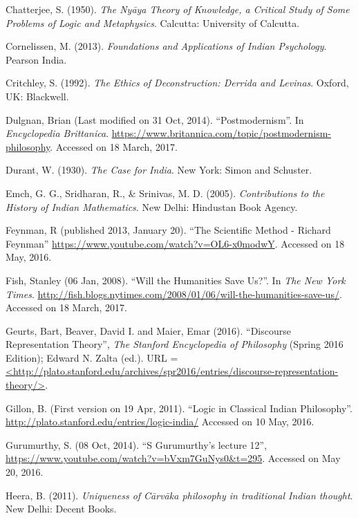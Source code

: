 \begin{thebibliography}{99}
Chatterjee, S. (1950). {\sl The Nyāya Theory of Knowledge, a Critical Study of Some Problems of Logic and Metaphysics}. Calcutta: University of Calcutta.

Cornelissen, M. (2013). {\sl Foundations and Applications of Indian Psychology}. Pearson India.

Critchley, S. (1992). {\sl The Ethics of Deconstruction: Derrida and Levinas}. Oxford, UK: Blackwell.

Dulgnan, Brian (Last modified on 31 Oct, 2014). ``Postmodernism''. In {\sl Encyclopedia Brittanica}. \url{https://www.britannica.com/topic/postmodernism-philosophy}.  Accessed on 18 March, 2017.

Durant, W. (1930). {\sl The Case for India}. New York: Simon and Schuster.

Emch, G. G., Sridharan, R., \& Srinivas, M. D. (2005). {\sl Contributions to the History of Indian Mathematics}. New Delhi: Hindustan Book Agency.

Feynman, R (published 2013, January 20). ``The Scientific Method - Richard Feynman'' \url{https://www.youtube.com/watch?v=OL6-x0modwY}. Accessed on 18 May, 2016.

Fish, Stanley (06 Jan, 2008). ``Will the Humanities Save Us?''. In {\sl The New York Times}. \url{http://fish.blogs.nytimes.com/2008/01/06/will-the-humanities-save-us/}. Accessed on 18 March, 2017.

Geurts, Bart, Beaver, David I. and Maier, Emar (2016). ``Discourse Representation Theory'', {\sl The Stanford Encyclopedia of Philosophy} (Spring 2016 Edition); Edward N. Zalta (ed.). URL = \url{<http://plato.stanford.edu/archives/spr2016/entries/discourse-representation-theory/>}.

Gillon, B. (First version on 19 Apr, 2011). ``Logic in Classical Indian Philosophy''. \url{http://plato.stanford.edu/entries/logic-india/} Accessed on 10 May, 2016.

Gurumurthy, S. (08 Oct, 2014). ``S Gurumurthy's lecture 12'', \url{https://www.youtube.com/watch?v=bVxm7GuNys0&t=295}. Accessed on May 20, 2016. 

Heera, B. (2011). {\sl Uniqueness of Cārvāka philosophy in traditional Indian thought}. New Delhi: Decent Books.


\end{thebibliography}

